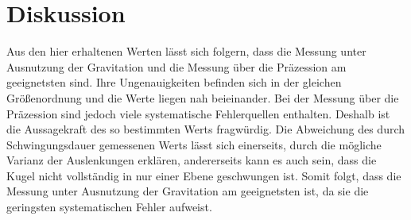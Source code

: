 \section{Diskussion}
\label{sec:Diskussion}
Aus den hier erhaltenen Werten lässt sich folgern, dass die Messung unter Ausnutzung der Gravitation und die Messung über die Präzession am geeignetsten sind.
Ihre Ungenauigkeiten befinden sich in der gleichen Größenordnung und die Werte liegen nah beieinander.
Bei der Messung über die Präzession sind jedoch viele systematische Fehlerquellen enthalten.
Deshalb ist die Aussagekraft des so bestimmten Werts fragwürdig.
Die Abweichung des durch Schwingungsdauer gemessenen Werts lässt sich einerseits, durch die mögliche Varianz der Auslenkungen erklären, andererseits kann es auch sein, dass die Kugel nicht vollständig in nur einer Ebene geschwungen ist.
Somit folgt, dass die Messung unter Ausnutzung der Gravitation am geeignetsten ist, da sie die geringsten systematischen Fehler aufweist.
